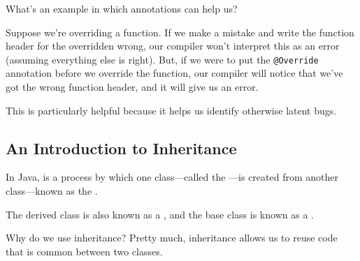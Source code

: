 What's an example in which annotations can help us?

Suppose we're overriding a function. If we make a mistake and write the function header for the overridden wrong, our compiler won't interpret this as an error (assuming everything else is right). But, if we were to put the \verb!@Override! annotation before we override the function, our compiler will notice that we've got the wrong function header, and it will give us an error. 

This is particularly helpful because it helps us identify otherwise latent bugs.

\subsection{An Introduction to Inheritance}
In Java,  is a process by which one class---called the ---is created from another class---known as the .

The derived class is also known as a , and the base class is known as a .


Why do we use inheritance? Pretty much, inheritance allows us to reuse code that is common between two classes.


